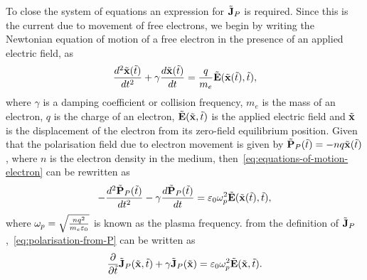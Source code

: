 To close the system of equations an expression for $\tilde{\mathbf{J}}_P$ is required. Since
this is the current due to movement of free electrons, we begin by writing the
Newtonian equation of motion of a free electron in the presence of an applied
electric field, as
\begin{equation}
  \frac{d^2 \tilde{\mathbf{x}}(\tilde{t}) }{dt^2}+ \gamma \frac{d \tilde{\mathbf{x}}(\tilde{t}) }{dt}= \frac{q}{m_e}\tilde{\mathbf{E}}(\tilde{\mathbf{x}}(\tilde{t}),\tilde{t}),
  \label{eq:equations-of-motion-electron}
\end{equation}
where $\gamma$ is a damping coefficient or collision frequency, $m_e$ is the
mass of an electron, $q$ is the charge of an electron,
$\tilde{\mathbf{E}}(\tilde{\mathbf{x}},\tilde{t})$ is the applied electric field and $\tilde{\mathbf{x}}$ is
the displacement of the electron from its zero-field equilibrium position. Given
that the polarisation field due to electron movement is given by $
\tilde{\mathbf{P}}_P(\tilde{t}) = - n q \tilde{\mathbf{x}}(\tilde{t})$, where $n$ is the electron
density in the medium, then~\eqref{eq:equations-of-motion-electron} can be
rewritten as
\begin{equation}
  \label{eq:polarisation-from-P}
  - \frac{d^2 \tilde{\mathbf{P}}_P(\tilde{t}) }{dt^2} - \gamma \frac{d \tilde{\mathbf{P}}_P(\tilde{t}) }{dt} = \varepsilon_0 \omega_p^2 \tilde{\mathbf{E}}(\tilde{\mathbf{x}}(\tilde{t}),\tilde{t}),
\end{equation}
where $\omega_p = \sqrt{\frac{n q^2}{m_e \varepsilon_0}}$ is known as the plasma
frequency.
%
from the definition of $\tilde{\mathbf{J}}_P$,~\eqref{eq:polarisation-from-P} can be written as
\begin{equation}
  \frac{\partial}{\partial \tilde{t} } \tilde{\mathbf{J}}_P(\tilde{\mathbf{x}},\tilde{t}) + \gamma \tilde{\mathbf{J}}_P(\tilde{\mathbf{x}}) = \varepsilon_0 \omega_p^2 \tilde{\mathbf{E}}(\tilde{\mathbf{x}},\tilde{t}).
  \label{eq:pol-current-ADE}
\end{equation}

